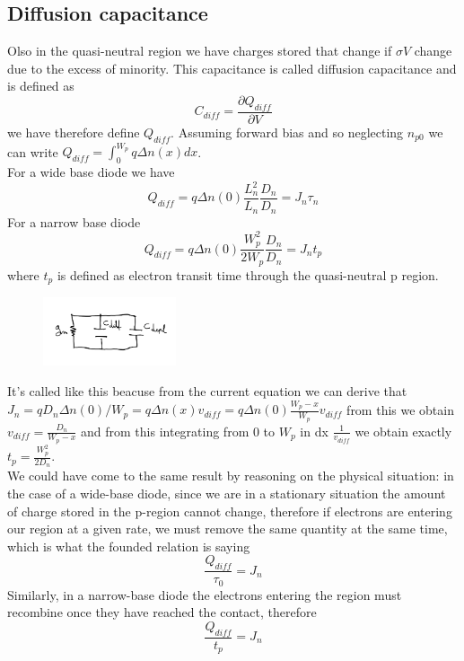 \subsection{Diffusion capacitance}
Olso in the quasi-neutral region we have charges stored that change if $\sigma V$ change due to the excess of minority. This capacitance is called diffusion capacitance and is defined as 
\begin{equation}
C_{diff}=\frac{\partial Q_{diff}}{\partial V}
\end{equation} 
we have therefore define $Q_{diff}$. Assuming forward bias and so neglecting $n_{p0}$ we can write $Q_{diff}=\int^{W_p}_0 q\Delta n(x) dx$.\\
For a wide base diode we have 
\begin{equation}
Q_{diff}=q\Delta n(0) \frac{L_n^2}{L_n}\frac{D_n}{D_n}=J_n\tau_n
\end{equation}
For a narrow base diode 
\begin{equation}
Q_{diff}=q\Delta n(0) \frac{W_p^2}{2W_p}\frac{D_n}{D_n}=J_nt_p
\end{equation}
where $t_p$ is defined as electron transit time through the quasi-neutral p region.\\

\begin{figure}
\includegraphics[width=0.35\textwidth]{smallpn.png}
\end{figure}

It's called like this beacuse from the current equation we can derive that $J_n=qD_n\Delta n(0)/W_p=q\Delta n(x) v_{diff}=q\Delta n(0)\frac{W_p-x}{W_p} v_{diff}$ from this we obtain $v_{diff}=\frac{D_n}{W_p-x}$ and from this integrating from 0 to $W_p$ in dx $\frac{1}{v_{diff}}$ we obtain exactly $t_p=\frac{W_p^2}{2D_n}$.\\

We could have come to the same result by reasoning on the physical situation: in the case of a wide-base diode, since we are in a stationary situation the amount of charge stored in the p-region cannot change, therefore if electrons are entering our region at a given rate, we must remove the same quantity at the same time, which is what the founded relation is saying
\begin{equation}
\frac{Q_{diff}}{\tau_0}=J_n
\end{equation}
Similarly, in a narrow-base diode the electrons entering the region must
recombine once they have reached the contact, therefore
\begin{equation}
\frac{Q_{diff}}{t_p}=J_n
\end{equation}
\vspace{5mm}\\

